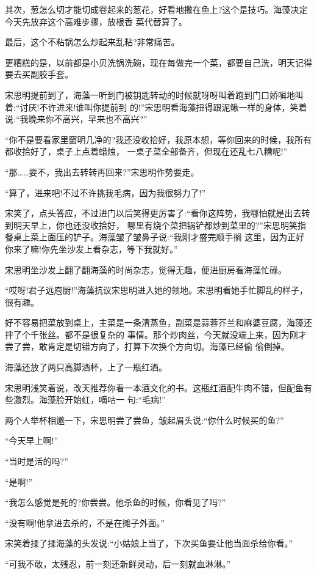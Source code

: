 \documentclass[11pt,a4paper,onecolumn]{article}
\begin{document}
其次，葱怎么切才能切成卷起来的葱花，好看地撒在鱼上?这个是技巧。海藻决定今天先放弃这个高难步骤，放根香
菜代替算了。

最后，这个不粘锅怎么炒起来乱粘?非常痛苦。

更糟糕的是，以前都是小贝洗锅洗碗，现在每做完一个菜，都要自己洗，明天记得要去买副胶手套。

宋思明提前到了，海藻一听到门被钥匙转动的时候就呀呀叫着跑到门口娇嗔地叫着:``讨厌!不许进来!谁叫你提前到
的!''宋思明看海藻扭得跟泥鳅一样的身体，笑着说:``我晚来你不高兴，早来也不高兴?''

``你不是要看家里窗明几净的?我还没收拾好，我原本想，等你回来的时候，我所有都收拾好了，桌子上点着蜡烛，
一桌子菜全部备齐，但现在还乱七八糟呢!''

``那……要不，我出去转转再回来?''宋思明作势要走。

``算了，进来吧!不过不许挑我毛病，因为我很努力了!''

宋笑了，点头答应，不过进门以后笑得更厉害了:``看你这阵势，我哪怕就是出去转到明天早上，你也还没收拾好，
哪里有烧个菜把锅铲都炒到菜里的?''宋思明笑指餐桌上菜上面压的铲子。海藻皱了皱鼻子说:``我刚才盛完顺手搁
这里，因为正好你来了嘛!你先坐沙发上看杂志，等下我就好。''

宋思明坐沙发上翻了翻海藻的时尚杂志，觉得无趣，便进厨房看海藻忙碌。

``哎呀!君子远庖厨!''海藻抗议宋思明进入她的领地。宋思明看她手忙脚乱的样子，很有趣。

好不容易把菜放到桌上，主菜是一条清蒸鱼，副菜是蒜蓉芥兰和麻婆豆腐，海藻还拌了个千张丝。都不是很复杂的
事情。那个炒肉丝，今天就没端上来，因为刚才尝了尝，敢肯定是切错方向了，打算下次换个方向切。海藻已经偷
偷倒掉。

海藻还放了两只高脚酒杯，上了一瓶红酒。

宋思明浅笑着说，改天推荐你看一本酒文化的书。这瓶红酒配牛肉不错，但配鱼有些激烈。海藻脸开始红，嘀咕一
句:``毛病!''

两个人举杯相邀一下，宋思明尝了尝鱼，皱起眉头说:``你什么时候买的鱼?''

``今天早上啊!''

``当时是活的吗?''

``是啊!''

``我怎么感觉是死的?你尝尝。他杀鱼的时候，你看见了吗?''

``没有啊!他拿进去杀的，不是在摊子外面。''

宋笑着揉了揉海藻的头发说:``小姑娘上当了，下次买鱼要让他当面杀给你看。''

``可我不敢，太残忍，前一刻还新鲜灵动，后一刻就血淋淋。''
\end{document}
